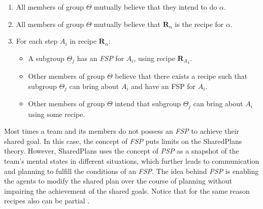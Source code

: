 \documentclass[12pt]{report}
\begin{document}
\begin{enumerate}
  \item All members of group $\Theta$ mutually believe that they intend to do
  $\alpha$.
  \item All members of group $\Theta$ mutually believe that
  \textit{$\textbf{R}_\alpha$} is the recipe for $\alpha$.
  \item For each step \textit{$A_i$} in recipe \textit{$\textbf{R}_\alpha$}:
  \begin{itemize}
    \item A subgroup $\Theta_j$ has an \textit{FSP} for \textit{$A_i$}, using
    recipe \textit{${\textbf{R}_A}_i$}.
    \item Other members of group $\Theta$ believe that there exists a recipe
    such that subgroup $\Theta_j$ can bring about \textit{$A_i$} and have an FSP
    for \textit{$A_i$}.
    \item Other members of group $\Theta$ intend that subgroup $\Theta_j$ can
    bring about \textit{$A_i$} using some recipe.
  \end{itemize}
\end{enumerate}

Most times a team and its members do not possess an \textit{FSP} to
achieve their shared goal. In this case, the concept of \textit{FSP} puts limits
on the SharedPlans theory. However, SharedPlans uses the concept of \textit{PSP}
as a snapshot of the team's mental states in different situations, which further
leads to communication and planning to fulfill the conditions of an
\textit{FSP}. The idea behind \textit{PSP} is enabling the agents to modify the
shared plan over the course of planning without impairing the achievement of the
shared goals. Notice that for the same reason recipes also can be partial
\cite{grosz:collaboration, grosz:plans-discourse}.
\end{document}
